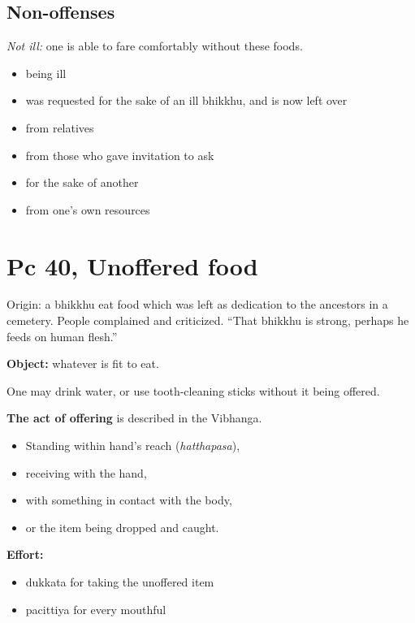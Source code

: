 \subsection{Non-offenses}

\emph{Not ill:} one is able to fare comfortably without these foods.

\begin{multicols}{2}

\begin{itemize}
\tightlist
\item
  being ill
\item
  was requested for the sake of an ill bhikkhu, and is now left over
\item
  from relatives
\item
  from those who gave invitation to ask
\item
  for the sake of another
\item
  from one's own resources
\end{itemize}

\end{multicols}

\section{Pc 40, Unoffered food}

Origin: a bhikkhu eat food which was left as dedication to the ancestors
in a cemetery. People complained and criticized. ``That bhikkhu is
strong, perhaps he feeds on human flesh.''

\textbf{Object:} whatever is fit to eat.

One may drink water, or use tooth-cleaning sticks without it being
offered.

\textbf{The act of offering} is described in the Vibhanga.

\begin{itemize}
\tightlist
\item
  Standing within hand's reach (\emph{hatthapasa}),
\item
  receiving with the hand,
\item
  with something in contact with the body,
\item
  or the item being dropped and caught.
\end{itemize}

\textbf{Effort:}

\begin{itemize}
\tightlist
\item
  dukkata for taking the unoffered item
\item
  pacittiya for every mouthful
\end{itemize}


